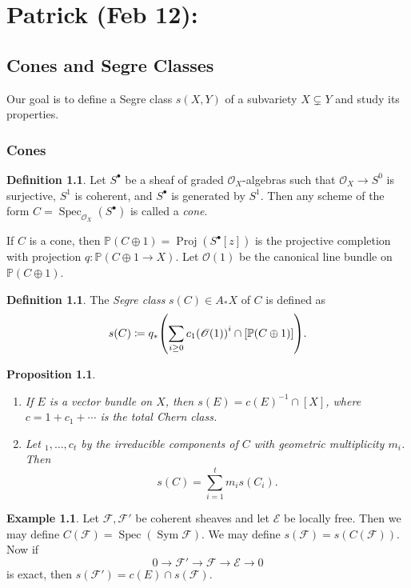 \documentclass[leqno, openany]{memoir}
\newtheorem{prop}[thm]{Proposition}
\theoremstyle{definition}
\newtheorem{defn}[thm]{Definition}
\newtheorem{exm}[thm]{Example}
\theoremstyle{remark}
\theoremstyle{plain}
\theoremstyle{definition}
\theoremstyle{remark}
\renewcommand{\P}{\mathbb{P}}
\newcommand{\msc}[1]{\mathscr{#1}}
\DeclareMathOperator{\Spec}{Spec}
\DeclareMathOperator{\Proj}{Proj}
\begin{document}
\chapter{Patrick (Feb 12): }%
\label{cha:patrick_feb_12_}

\section{Cones and Segre Classes}%
\label{sec:cones_and_segre_classes}

Our goal is to define a Segre class $s(X,Y)$ of a subvariety $X \subsetneq Y$ and study its properties.

\subsection{Cones}%
\label{sub:cones}

\begin{defn}
    Let $S^{\bullet}$ be a sheaf of graded $\msc{O}_X$-algebras such that $\msc{O}_X \to S^0$ is surjective, $S^1$ is coherent, and $S^{\bullet}$ is generated by $S^1$. Then any scheme of the form $C = \Spec_{\msc{O}_X}(S^{\bullet})$ is called a \textit{cone}. 
\end{defn}

If $C$ is a cone, then $\P(C \oplus 1) = \Proj (S^{\bullet}[z])$ is the projective completion with projection $q \colon \P(C \oplus 1 \to X)$. Let $\msc{O}(1)$ be the canonical line bundle on $\P(C \oplus 1)$.

\begin{defn}
    The \textit{Segre class} $s(C) \in A_* X$ of $C$ is defined as
    \[ s(C) \coloneqq q_* \qty( \sum_{i \geq 0} {c_1(\msc{O}(1))}^i \cap [\P(C \oplus 1)] ). \]
\end{defn}

\begin{prop}\leavevmode
    \begin{enumerate}
        \item If $E$ is a vector bundle on $X$, then $s(E) = {c(E)}^{-1} \cap [X]$, where $c = 1 + c_1 + \cdots$ is the total Chern class.
        \item Let $_1, \ldots, c_t$ by the irreducible components of $C$ with geometric multiplicity $m_i$. Then
            \[ s(C) = \sum_{i = 1}^t m_i s(C_i). \]
    \end{enumerate}
\end{prop}

\begin{exm}
    Let $\msc{F}, \msc{F'}$ be coherent sheaves and let $\msc{E}$ be locally free. Then we may define $C(\msc{F}) = \Spec ( \operatorname{Sym} \msc{F} )$. We may define $s(\msc{F}) = s(C(\msc{F}))$. Now if 
    \[ 0 \to \msc{F}' \to \msc{F} \to \msc{E} \to 0 \]
    is exact, then $s(\msc{F'}) = c(E) \cap s(\msc{F})$.
\end{exm}
\end{document}
